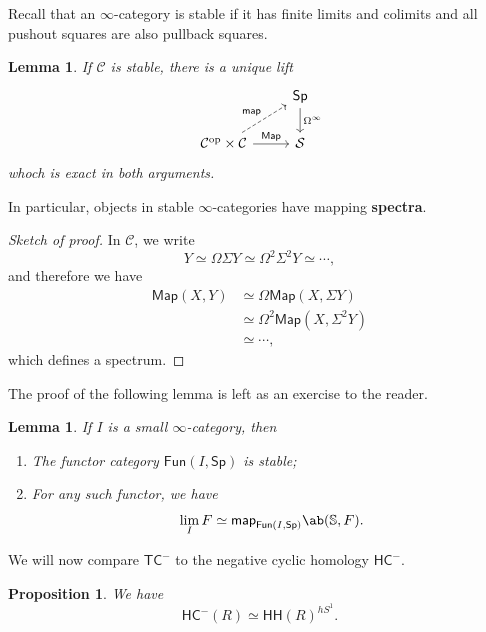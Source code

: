 \documentclass[10pt, oneside]{memoir}
\newtheorem{prop}[thm]{Proposition}
\newtheorem{lem}[thm]{Lemma}
\theoremstyle{definition}
\theoremstyle{remark}
\theoremstyle{plain}
\theoremstyle{definition}
\theoremstyle{remark}
\newcommand{\bS}{\mathbb{S}}
\newcommand{\mc}[1]{\mathcal{#1}}
\newcommand{\ms}[1]{\mathsf{#1}}
\newcommand{\1}{\mathbf{1}}
\newcommand{\2}{\mathbf{2}}
\newcommand{\3}{\mathbf{3}}
\newcommand{\HC}{\ms{HC}}
\newcommand{\TC}{\ms{TC}}
\newcommand{\HH}{\ms{HH}}
\DeclareMathOperator{\op}{op}
\begin{document}
Recall that an \(\infty \)-category is stable if it has finite limits and colimits and all pushout squares are also pullback squares.

\begin{lem}
    If \(\mc{C} \) is stable, there is a unique lift
    \begin{equation*}
    \begin{tikzcd}
        & \ms{Sp} \ar{d}{\Omega^{\infty}} \\
        \mc{C}^{\op} \times \mc{C} \ar{r}{\ms{Map}} \ar[dashrightarrow]{ur}{\ms{map}} & \mc{S}
    \end{tikzcd}
    \end{equation*}
    whoch is exact in both arguments.
\end{lem}

In particular, objects in stable \(\infty \)-categories have mapping \textbf{spectra}.

\begin{proof}[Sketch of proof]
    In \(\mc{C} \), we write
    \[ Y \simeq \Omega \Sigma Y \simeq \Omega^2 \Sigma^2 Y \simeq \cdots, \]
    and therefore we have
    \begin{align*}
        \ms{Map}(X,Y) &\simeq \Omega \ms{Map}(X, \Sigma Y) \\
        &\simeq \Omega^2 \ms{Map}(X, \Sigma^2 Y) \\
        &\simeq \cdots,
    \end{align*}
    which defines a spectrum.
\end{proof}

The proof of the following lemma is left as an exercise to the reader.

\begin{lem}
    If \(I \) is a small \(\infty \)-category, then
    \begin{enumerate}
        \item The functor category \(\ms{Fun}(I, \ms{Sp}) \) is stable;
        \item For any such functor, we have
        \[ \lim_I F \simeq \ms{map}_{\ms{Fun}(I, \ms{Sp})} \ab( \bS, F). \]
    \end{enumerate}
\end{lem}

We will now compare \(\TC^- \) to the negative cyclic homology \(\HC^- \).

\begin{prop}
    We have
    \[ \HC^-(R) \simeq \HH(R)^{hS^1}. \]
\end{prop}
\end{document}
